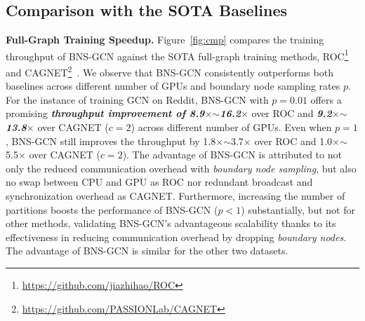 \documentclass{article}
\newcommand{\niparagraph}[1]{\noindent\textbf{#1}}
\begin{document}
\subsection{
Comparison with the SOTA Baselines}
\niparagraph{Full-Graph Training Speedup.}
\label{sec:efficiency}
Figure~\ref{fig:cmp} compares the training throughput of BNS-GCN against the SOTA full-graph training methods, ROC\footnote{\href{https://github.com/jiazhihao/ROC}{https://github.com/jiazhihao/ROC}}~\citep{jia2020improving} and CAGNET\footnote{\href{https://github.com/PASSIONLab/CAGNET}{https://github.com/PASSIONLab/CAGNET}}~\citep{tripathy2020reducing}.
We observe that BNS-GCN consistently outperforms both baselines across different number of GPUs and boundary node sampling rates $p$. 
For the instance of training GCN on Reddit, BNS-GCN with $p=0.01$ offers a promising \textbf{\textit{throughput improvement of 8.9$\times$$\sim$16.2$\mathbf{\times}$}} over ROC and \textit{\textbf{9.2$\times$$\sim$13.8$\times$}} over CAGNET ($c=2$) across different number of GPUs.
Even when $p=1$, BNS-GCN still improves the throughput by 1.8$\times$$\sim$3.7$\times$ over ROC and 1.0$\times$$\sim$5.5$\times$ over CAGNET ($c=2$).
The advantage of BNS-GCN is attributed to not only the reduced communication overhead with \textit{boundary node sampling}, but also no swap between CPU and GPU as ROC nor redundant broadcast and synchronization overhead as CAGNET.
Furthermore, increasing the number of partitions boosts the performance of BNS-GCN ($p<1$) substantially, but not for other methods, validating 
BNS-GCN's advantageous scalability thanks to its effectiveness in reducing communication overhead by dropping \textit{boundary nodes}. 
The advantage of BNS-GCN is similar for the other two datasets.
\end{document}
